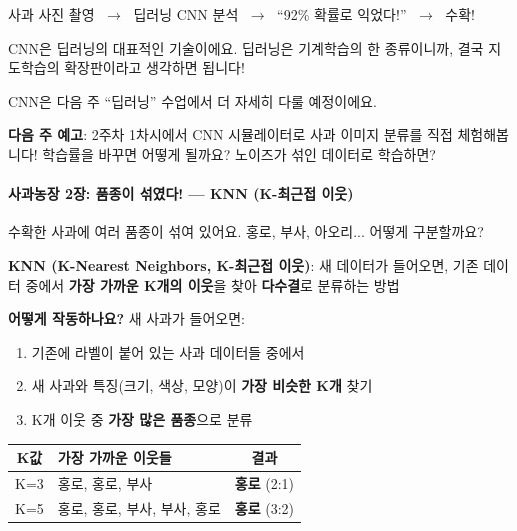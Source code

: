 \documentclass[11pt,a4paper]{article}
\begin{document}
\begin{tcolorbox}[colback=lightblue!30, colframe=primary!60, rounded corners, boxrule=0.5pt]
\centering
{} 사과 사진 촬영 $\;\to\;$  딥러닝 CNN 분석 $\;\to\;$  ``92\% 확률로 익었다!'' $\;\to\;$  수확!
\end{tcolorbox}

CNN은 딥러닝의 대표적인 기술이에요. 딥러닝은 기계학습의 한 종류이니까, 결국 지도학습의 확장판이라고 생각하면 됩니다!

\begin{tipbox}
CNN은 다음 주 ``딥러닝'' 수업에서 더 자세히 다룰 예정이에요.

 \textbf{다음 주 예고}: 2주차 1차시에서 CNN 시뮬레이터로 사과 이미지 분류를 직접 체험해봅니다! 학습률을 바꾸면 어떻게 될까요? 노이즈가 섞인 데이터로 학습하면?
\end{tipbox}

\paragraph{사과농장 2장: 품종이 섞였다! — KNN (K-최근접 이웃)}

수확한 사과에 여러 품종이 섞여 있어요. 홍로, 부사, 아오리... 어떻게 구분할까요?

\begin{definitionbox}
\textbf{KNN (K-Nearest Neighbors, K-최근접 이웃)}: 새 데이터가 들어오면, 기존 데이터 중에서 \textbf{가장 가까운 K개의 이웃}을 찾아 \textbf{다수결}로 분류하는 방법
\end{definitionbox}

\textbf{어떻게 작동하나요?} 새 사과가 들어오면:
\begin{enumerate}[leftmargin=*]
    \item 기존에 라벨이 붙어 있는 사과 데이터들 중에서
    \item 새 사과와 특징(크기, 색상, 모양)이 \textbf{가장 비슷한 K개} 찾기
    \item K개 이웃 중 \textbf{가장 많은 품종}으로 분류
\end{enumerate}

\begin{center}
\begin{tabular}{|c|p{5cm}|c|}
\hline
\rowcolor{tableheader}
\textbf{K값} & \textbf{가장 가까운 이웃들} & \textbf{결과} \\
\hline
K=3 & 홍로, 홍로, 부사 & \textbf{홍로} (2:1) \\
\hline
K=5 & 홍로, 홍로, 부사, 부사, 홍로 & \textbf{홍로} (3:2) \\
\hline
\end{tabular}
\end{center}
\end{document}
